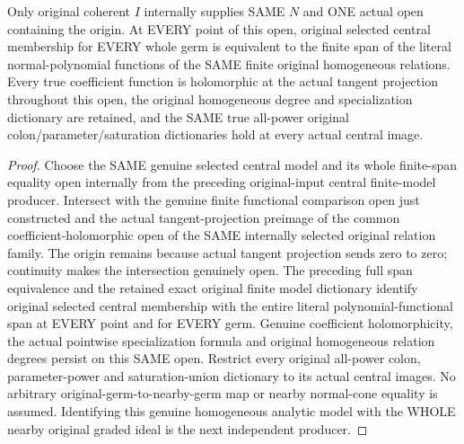 \begin{theorem}
\label{hir:relative-normal-central-original-whole-polynomial-model}
\leanok
Only original coherent $I$ internally supplies SAME $N$ and ONE actual open containing the origin. At EVERY point of this open, original selected central membership for EVERY whole germ is equivalent to the finite span of the literal normal-polynomial functions of the SAME finite original homogeneous relations. Every true coefficient function is holomorphic at the actual tangent projection throughout this open, the original homogeneous degree and specialization dictionary are retained, and the SAME true all-power original colon/parameter/saturation dictionaries hold at every actual central image.
\end{theorem}
\begin{proof}
Choose the SAME genuine selected central model and its whole finite-span equality open internally from the preceding original-input central finite-model producer. Intersect with the genuine finite functional comparison open just constructed and the actual tangent-projection preimage of the common coefficient-holomorphic open of the SAME internally selected original relation family. The origin remains because actual tangent projection sends zero to zero; continuity makes the intersection genuinely open. The preceding full span equivalence and the retained exact original finite model dictionary identify original selected central membership with the entire literal polynomial-functional span at EVERY point and for EVERY germ. Genuine coefficient holomorphicity, the actual pointwise specialization formula and original homogeneous relation degrees persist on this SAME open. Restrict every original all-power colon, parameter-power and saturation-union dictionary to its actual central images. No arbitrary original-germ-to-nearby-germ map or nearby normal-cone equality is assumed. Identifying this genuine homogeneous analytic model with the WHOLE nearby original graded ideal is the next independent producer.
\end{proof}

